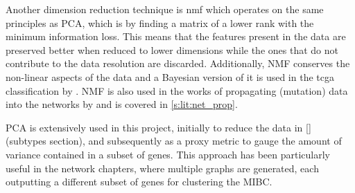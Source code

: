 Another dimension reduction technique is \acrfull{nmf} which operates on the same principles as PCA, which is by finding a matrix of a lower rank with the minimum information loss. This means that the features present in the data are preserved better when reduced to lower dimensions while the ones that do not contribute to the data resolution are discarded. Additionally, NMF conserves the non-linear aspects of the data and a Bayesian version of it is used in the \acrfull{tcga} classification by \citet{Robertson2017-mg}. NMF is also  used in the works of propagating (mutation) data into the networks by \citet{Yang2016-dm, Cai2008-fv} and is covered in \cref{s:lit:net_prop}.

PCA is extensively used in this project, initially to reduce the data in \ref{} (subtypes section), and subsequently as a proxy metric to gauge the amount of variance contained in a subset of genes. This approach has been particularly useful in the network chapters, where multiple graphs are generated, each outputting a different subset of genes for clustering the MIBC.

